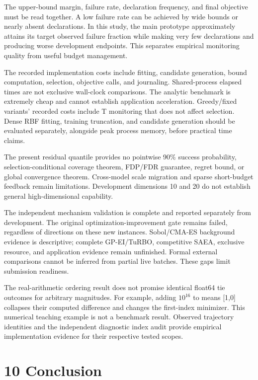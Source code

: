 \documentclass[11pt,a4paper]{article}
\begin{document}
The upper-bound margin, failure rate, declaration frequency, and final
objective must be read together. A low failure rate can be achieved by
wide bounds or nearly absent declarations. In this study, the main
prototype approximately attains its target observed failure fraction
while making very few declarations and producing worse development
endpoints. This separates empirical monitoring quality from useful
budget management.

The recorded implementation costs include fitting, candidate generation,
bound computation, selection, objective calls, and journaling.
Shared-process elapsed times are not exclusive wall-clock comparisons.
The analytic benchmark is extremely cheap and cannot establish
application acceleration. Greedy/fixed variants' recorded costs include
T monitoring that does not affect selection. Dense RBF fitting, training
truncation, and candidate generation should be evaluated separately,
alongside peak process memory, before practical time claims.

The present residual quantile provides no pointwise 90\% success
probability, selection-conditional coverage theorem, FDP/FDR guarantee,
regret bound, or global convergence theorem. Cross-model scale migration
and sparse short-budget feedback remain limitations. Development
dimensions 10 and 20 do not establish general high-dimensional
capability.

The independent mechanism validation is complete and reported separately
from development. The original optimization-improvement gate remains
failed, regardless of directions on these new instances. Sobol/CMA-ES
background evidence is descriptive; complete GP-EI/TuRBO, competitive
SAEA, exclusive resource, and application evidence remain unfinished.
Formal external comparisons cannot be inferred from partial live
batches. These gaps limit submission readiness.

The real-arithmetic ordering result does not promise identical float64
tie outcomes for arbitrary magnitudes. For example, adding \(10^{16}\)
to means {[}1,0{]} collapses their computed difference and changes the
first-index minimizer. This numerical teaching example is not a
benchmark result. Observed trajectory identities and the independent
diagnostic index audit provide empirical implementation evidence for
their respective tested scopes.

\hypertarget{conclusion}{%
\section{10 Conclusion}\label{conclusion}}
\end{document}
